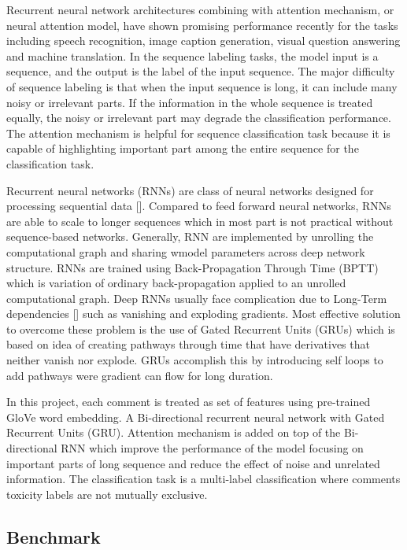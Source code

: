 \documentclass{article}
\begin{document}
    Recurrent neural network architectures combining with attention mechanism,
    or neural attention model, have shown promising performance recently for
    the tasks including speech recognition, image caption generation,
    visual question answering and machine translation.
    In the sequence labeling tasks,
    the model input is a sequence, and the output is the label of the
    input sequence. The major difficulty of sequence labeling is that when
    the input sequence is long, it can include many noisy or irrelevant parts.
    If the information in the whole sequence is treated equally, the noisy or
    irrelevant part may degrade the classification performance.
    The attention mechanism is helpful for sequence classification task because
    it is capable of highlighting important part among the entire sequence for
    the classification task.

    Recurrent neural networks (RNNs) are class of neural networks designed for processing sequential data [\cite{goodfellow2016deep}]. Compared to feed forward neural networks, RNNs are able to scale to longer sequences which in most part is not practical without sequence-based networks. Generally, RNN are implemented by unrolling the computational graph and sharing wmodel parameters across deep network structure. RNNs are trained using Back-Propagation Through Time (BPTT) which is variation of ordinary back-propagation applied to an unrolled computational graph. Deep RNNs usually face complication due to Long-Term dependencies [\cite{goodfellow2016deep}] such as vanishing and exploding gradients. Most effective solution to overcome these problem is the use of Gated Recurrent Units (GRUs) which is based on idea of creating pathways through time that have derivatives that neither vanish nor explode. GRUs accomplish this by introducing self loops to add pathways were gradient can flow for long duration.


    In this project, each comment is treated as set of features using pre-trained GloVe word embedding. A Bi-directional recurrent neural network with Gated Recurrent Units (GRU). Attention mechanism is added on top of the Bi-directional RNN which improve the performance of the model focusing on important parts of long sequence and reduce the effect of noise and unrelated information. The classification task is a multi-label classification where comments toxicity labels are not mutually exclusive.



    \subsection{Benchmark}
\end{document}
